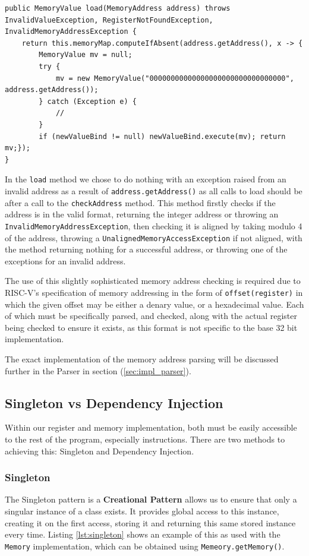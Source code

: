 \begin{lstlisting}[caption=Memory load method, label=lst:mem_load]
public MemoryValue load(MemoryAddress address) throws InvalidValueException, RegisterNotFoundException, InvalidMemoryAddressException {
    return this.memoryMap.computeIfAbsent(address.getAddress(), x -> {
        MemoryValue mv = null;
        try {
            mv = new MemoryValue("00000000000000000000000000000000", address.getAddress());
        } catch (Exception e) {
            //
        }
        if (newValueBind != null) newValueBind.execute(mv); return mv;});
}
\end{lstlisting}

In the \texttt{load} method we chose to do nothing with an exception raised from an invalid address as a result of \texttt{address.getAddress()} as all calls to load should be after a call to the \texttt{checkAddress} method. This method firstly checks if the address is in the valid format, returning the integer address or throwing an \texttt{InvalidMemoryAddressException}, then checking it is aligned by taking modulo 4 of the address, throwing a \texttt{UnalignedMemoryAccessException} if not aligned, with the method returning nothing for a successful address, or throwing one of the exceptions for an invalid address.

The use of this slightly sophisticated memory address checking is required due to RISC-V's specification of memory addressing in the form of \verb|offset(register)| in which the given offset may be either a denary value, or a hexadecimal value. Each of which must be specifically parsed, and checked, along with the actual register being checked to ensure it exists, as this format is not specific to the base 32 bit implementation. 

The exact implementation of the memory address parsing will be discussed further in the Parser in section (\ref{sec:impl_parser}).

\subsection{Singleton vs Dependency Injection}
Within our register and memory implementation, both must be easily accessible to the rest of the program, especially instructions. There are two methods to achieving this: Singleton and Dependency Injection.

\subsubsection{Singleton}
The Singleton pattern is a \textbf{Creational Pattern} allows us to ensure that only a singular instance of a class exists. It provides global access to this instance, creating it on the first access, storing it and returning this same stored instance every time. Listing \ref{lst:singleton} shows an example of this as used with the \texttt{Memory} implementation, which can be obtained using \verb|Memeory.getMemory()|.

